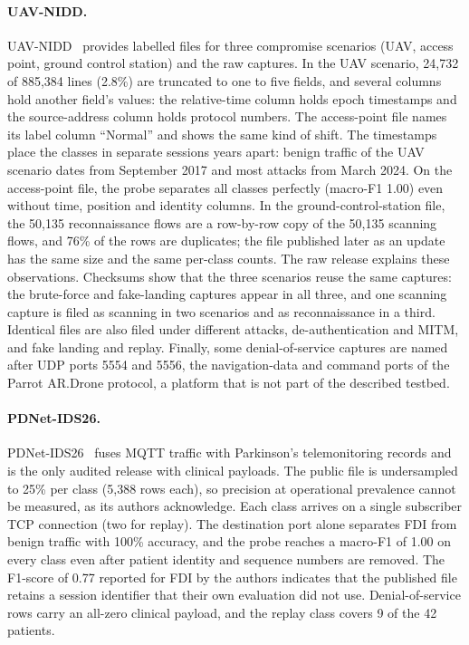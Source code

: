 \paragraph{UAV-NIDD.}
UAV-NIDD~\cite{hadi2025uavnidd,hadi2025uavniddData} provides labelled files for three
compromise scenarios (UAV, access point, ground control station) and the raw captures.
In the UAV scenario, 24{,}732 of 885{,}384 lines (2.8\%) are truncated to one to five
fields, and several columns hold another field's values: the relative-time column holds
epoch timestamps and the source-address column holds protocol numbers. The
access-point file names its label column ``Normal'' and shows the same kind of shift.
The timestamps place the classes in separate sessions years apart: benign traffic of the
UAV scenario dates from September 2017 and most attacks from March 2024. On the
access-point file, the probe separates all classes perfectly (macro-F1 1.00) even
without time, position and identity columns. In the ground-control-station file, the
50{,}135 reconnaissance flows are a row-by-row copy of the 50{,}135 scanning flows, and
76\% of the rows are duplicates; the file published later as an update has the same
size and the same per-class counts. The raw release explains these observations.
Checksums show that the three scenarios reuse the same captures: the brute-force and
fake-landing captures appear in all three, and one scanning capture is filed as scanning
in two scenarios and as reconnaissance in a third. Identical files are also filed under
different attacks, de-authentication and MITM, and fake landing and replay. Finally,
some denial-of-service captures are named after UDP ports 5554 and 5556, the
navigation-data and command ports of the Parrot AR.Drone protocol, a platform that is
not part of the described testbed.

\paragraph{PDNet-IDS26.}
PDNet-IDS26~\cite{lui2026pdnet} fuses MQTT traffic with Parkinson's telemonitoring
records and is the only audited release with clinical payloads. The public file is
undersampled to 25\% per class (5{,}388 rows each), so precision at operational
prevalence cannot be measured, as its authors acknowledge. Each class arrives on a
single subscriber TCP connection (two for replay). The destination port alone separates
FDI from benign traffic with 100\% accuracy, and the probe reaches a macro-F1 of 1.00 on
every class even after patient identity and sequence numbers are removed. The F1-score
of 0.77 reported for FDI by the authors indicates that the published file retains a
session identifier that their own evaluation did not use. Denial-of-service rows carry
an all-zero clinical payload, and the replay class covers 9 of the 42 patients.

